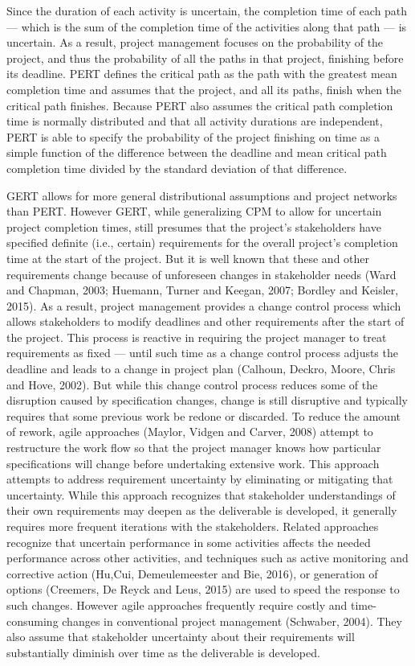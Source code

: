 \documentclass[11pt]{article}
\begin{document}
         Since the duration of each activity is uncertain, the completion time of each path --- which is the sum of the completion time of the activities along that path --- is uncertain.  As a result, project management focuses on the probability of the project, and thus the probability of all the paths in that project, finishing before its deadline.  PERT defines the critical path as the path with the greatest mean completion time and assumes that the project, and all its paths, finish when the critical path finishes.  Because PERT also assumes the critical path completion time is normally distributed and that all activity durations are independent, PERT is able to specify the probability of the project finishing on time as a simple function of the difference between the deadline and mean critical path completion time divided by the standard deviation of that difference.
         \par
         GERT allows for more general distributional assumptions and project networks than PERT.  However GERT, while generalizing CPM to allow for uncertain project completion times, still presumes that the project's stakeholders have specified definite (i.e., certain) requirements for the overall project's completion time at the start of the project.  But it is well known that these and other requirements change because of unforeseen changes in stakeholder needs (Ward and Chapman, 2003; Huemann, Turner and Keegan, 2007; Bordley and Keisler, 2015). As a result, project management provides a change control process which allows stakeholders to modify deadlines and other requirements after the start of the project.  This process is reactive in requiring the project manager to treat requirements as fixed --- until such time as a change control process adjusts the deadline and leads to a change in project plan (Calhoun, Deckro, Moore, Chris and Hove, 2002). But while this change control process reduces some of the disruption caused by specification changes,  change is still disruptive and typically requires that some previous work be redone or discarded.  To reduce the amount of rework, agile approaches (Maylor,  Vidgen and Carver, 2008) attempt to restructure the work flow so that the project manager knows how particular specifications will change before undertaking extensive work.  This approach attempts to address requirement uncertainty by eliminating or mitigating that uncertainty.  While this approach recognizes that stakeholder understandings of their own requirements may deepen as the deliverable is developed, it generally requires more frequent iterations with the stakeholders. Related approaches recognize that uncertain performance in some activities affects the needed performance across other activities, and techniques such as active monitoring and corrective action (Hu,Cui, Demeulemeester and Bie, 2016), or generation of options (Creemers, De Reyck and Leus, 2015) are used to speed the response to such changes. However agile approaches frequently require costly and time-consuming changes in conventional project management (Schwaber, 2004).  They also assume that stakeholder uncertainty about their requirements will substantially diminish over time as the deliverable is developed.
\end{document}
